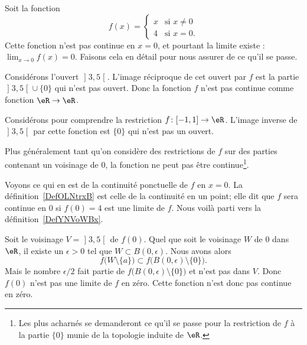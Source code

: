 \begin{example}     \label{EXooKREUooLeuIlv}
	Soit la fonction
	\begin{equation}        \label{EQooSYSWooSGsUfR}
		f(x)=\begin{cases}
			x & \text{si } x\neq 0 \\
			4 & \text{si } x=0.
		\end{cases}
	\end{equation}
	Cette fonction n'est pas continue en \( x=0\), et pourtant la limite existe : \( \lim_{x\to 0} f(x)=0\). Faisons cela en détail pour nous assurer de ce qu'il se passe.

	Considérons l'ouvert \( \mathopen] 3 , 5 \mathclose[\). L'image réciproque de cet ouvert par \( f\) est la partie \( \mathopen] 3 , 5 \mathclose[\cup\{ 0 \}\) qui n'est pas ouvert. Donc la fonction \( f\) n'est pas continue comme fonction \( \eR\to \eR\).

		Considérons pour comprendre la restriction \( f\colon \mathopen[ -1 , 1 \mathclose]\to \eR\). L'image inverse de \( \mathopen] 3 , 5 \mathclose[\) par cette fonction est \( \{ 0 \}\) qui n'est pas un ouvert.

		Plus généralement tant qu'on considère des restrictions de \( f\) sur des parties contenant un voisinage de \( 0\), la fonction ne peut pas être continue\footnote{Les plus acharnés se demanderont ce qu'il se passe pour la restriction de \( f\) à la partie \( \{ 0 \}\) munie de la topologie induite de $\eR$.}.

		Voyons ce qui en est de la continuité ponctuelle de \( f\) en \( x=0\). La définition~\ref{DefOLNtrxB} est celle de la continuité en un point; elle dit que \( f\) sera continue en \( 0\) si \( f(0)=4\) est une limite de \( f\). Nous voilà parti vers la définition~\ref{DefYNVoWBx}.

		Soit le voisinage \( V=\mathopen] 3 , 5 \mathclose[\) de \( f(0)\). Quel que soit le voisinage \( W\) de \( 0\) dans \( \eR\), il existe un \( \epsilon>0\) tel que \( W\subset B(0,\epsilon)\). Nous avons alors
	\begin{equation}
		f\big( W\setminus \{ a \} \big)\subset f\big( B(0,\epsilon)\setminus\{ 0 \} \big).
	\end{equation}
	Mais le nombre \( \epsilon/2\) fait partie de \( f\big( B(0,\epsilon)\setminus\{ 0 \} \big)\) et n'est pas dans \( V\). Donc \( f(0)\) n'est pas une limite de \( f\) en zéro. Cette fonction n'est donc pas continue en zéro.
\end{example}

